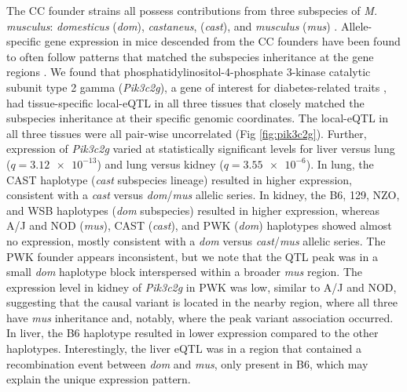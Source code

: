 \documentclass[10pt,letterpaper]{article}
\begin{document}
The CC founder strains all possess contributions from three subspecies of \textit{M. musculus}: \textit{domesticus} (\textit{dom}), \textit{castaneus}, (\textit{cast}), and \textit{musculus} (\textit{mus}) \cite{Yang2011}.  Allele-specific gene expression in mice descended from the CC founders have been found to often follow patterns that matched the subspecies inheritance at the gene regions \cite{Crowley2015}.
We found that phosphatidylinositol-4-phosphate 3-kinase catalytic subunit type 2 gamma (\textit{Pik3c2g}), a gene of interest for diabetes-related traits \cite{Braccini2015}, had tissue-specific local-eQTL in all three tissues that closely matched the subspecies inheritance at their specific genomic coordinates. The local-eQTL in all three tissues were all pair-wise uncorrelated (Fig \ref{fig:pik3c2g}). Further, expression of \textit{Pik3c2g} varied at statistically significant levels for liver versus lung ($q = \num{3.12e-13}$) and lung versus kidney ($q = \num{3.55e-6}$). 
In lung, the CAST haplotype (\textit{cast} subspecies lineage) resulted in higher expression, consistent with a \textit{cast} versus \textit{dom}/\textit{mus} allelic series. In kidney, the B6, 129, NZO, and WSB haplotypes  (\textit{dom} subspecies) resulted in higher expression, whereas A/J and NOD (\textit{mus}), CAST (\textit{cast}), and PWK (\textit{dom}) haplotypes showed almost no expression, mostly consistent with a \textit{dom} versus \textit{cast}/\textit{mus} allelic series. The PWK founder appears inconsistent, but we note that the QTL peak was in a small \textit{dom} haplotype block interspersed within a broader \textit{mus} region. The expression level in kidney of \textit{Pik3c2g} in PWK was low, similar to A/J and NOD, suggesting that the causal variant is located in the nearby region, where all three have \textit{mus} inheritance and, notably, where the peak variant association occurred. 
In liver, the B6 haplotype resulted in lower expression compared to the other haplotypes. Interestingly, the liver eQTL was in a region that contained a recombination event between \textit{dom} and \textit{mus}, only present in B6, which may explain the unique expression pattern.
\end{document}
